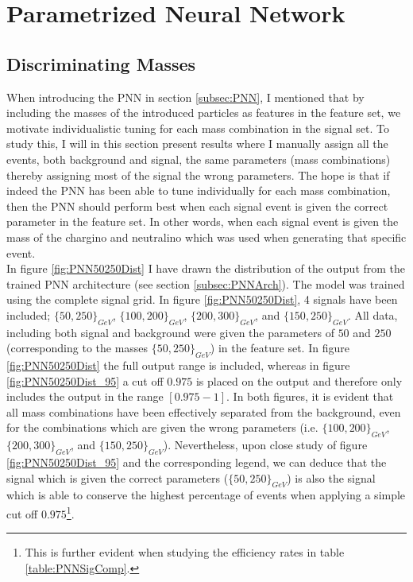 \section{Parametrized Neural Network}
\subsection{Discriminating Masses}
When introducing the \ac{PNN} in section \ref{subsec:PNN}, I mentioned that by including the masses of the introduced particles as features 
in the feature set, we motivate individualistic tuning for each mass combination in the signal set. To study this, I will in this section 
present results where I manually assign all the events, both background and signal, the same parameters (mass combinations) thereby assigning 
most of the signal the wrong parameters. The hope is that if indeed the \ac{PNN} has been able to tune individually for each mass combination, 
then the \ac{PNN} should perform best when each signal event is given the correct parameter in the feature set. In other words, when each signal 
event is given the mass of the chargino and neutralino which was used when generating that specific event.
\\
In figure \ref{fig:PNN50250Dist} I have drawn the distribution of the output from the trained \ac{PNN} architecture 
(see section \ref{subsec:PNNArch}). The model was trained using the complete signal grid. In figure \ref{fig:PNN50250Dist},
4 signals have been included; $\{50,250\}_{GeV}$, $\{100,200\}_{GeV}$, $\{200,300\}_{GeV}$, and $\{150,250\}_{GeV}$. All data, including 
both signal and background were given the parameters of $50$ and $250$ (corresponding to the masses $\{50,250\}_{GeV}$) in the feature set. 
In figure \ref{fig:PNN50250Dist} the full output range is included, whereas in figure \ref{fig:PNN50250Dist_95} a cut off $0.975$ is placed on the 
output and therefore only includes the output in the range $[0.975-1]$. In both figures, it is evident that all mass combinations have been 
effectively separated from the background, even for the combinations which are given the wrong parameters (i.e. $\{100,200\}_{GeV}$, $\{200,300\}_{GeV}$, 
and $\{150,250\}_{GeV}$). Nevertheless, upon close study of figure \ref{fig:PNN50250Dist_95} and the corresponding legend, we can deduce that the signal 
which is given the correct parameters ($\{50,250\}_{GeV}$) is also the signal which is able to conserve the highest percentage of events when applying a 
simple cut off $0.975$\footnote{This is further evident when studying the efficiency rates in table \ref{table:PNNSigComp}.}.\\
